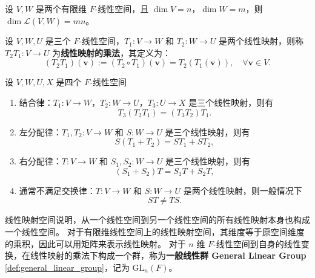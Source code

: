\begin{proposition}[有限维线性映射空间的维度]
    设 $V,W$ 是两个有限维 $F$-线性空间，且 $\dim V = n$，$\dim W = m$，则 $\dim \mathcal{L}(V,W) = mn$。
    \label{prop:finite_dimensional_linear_map_space_dimension}
\end{proposition}

\begin{definition}[线性映射的乘法]
    设 $V,W,U$ 是三个 $F$-线性空间，$T_1:V\to W$ 和 $T_2:W\to U$ 是两个线性映射，则称 $T_2 T_1:V\to U$ 为\textbf{线性映射的乘法}，其定义为：
    \[
        (T_2 T_1)(\mathbf{v}) := (T_2 \circ T_1)(\mathbf{v}) = T_2(T_1(\mathbf{v})), \quad \forall \mathbf{v}\in V.
    \]
\end{definition}

\begin{proposition}[线性映射乘法的性质]
    设 $V,W,U,X$ 是四个 $F$-线性空间
    \begin{enumerate}
        \item 结合律：$T_1:V\to W$，$T_2:W\to U$，$T_3:U\to X$ 是三个线性映射，则有
        \[
            T_3(T_2 T_1) = (T_3 T_2) T_1.
        \]
        \item 左分配律：$T_1,T_2:V\to W$ 和 $S:W\to U$ 是三个线性映射，则有
        \[
            S(T_1 + T_2) = S T_1 + S T_2,
        \]
        \item 右分配律：$T:V\to W$ 和 $S_1,S_2:W\to U$ 是三个线性映射，则有
        \[
            (S_1 + S_2) T = S_1 T + S_2 T,
        \]
        \item 通常不满足交换律：$T:V\to W$ 和 $S:W\to U$ 是两个线性映射，则一般情况下
        \[
            ST \neq TS.
        \]
    \end{enumerate}
\end{proposition}

\begin{note}
    线性映射空间说明，从一个线性空间到另一个线性空间的所有线性映射本身也构成一个线性空间。
    对于有限维线性空间上的线性映射空间，其维度等于原空间维度的乘积，因此可以用矩阵来表示线性映射。
    对于 $n$ 维 $F$-线性空间到自身的线性变换，在线性映射的乘法下构成一个群，称为\textbf{一般线性群 General Linear Group} \ref{def:general_linear_group}，记为 $\mathrm{GL}_n(F)$。
\end{note}

\vspace{1em}


\newpage
